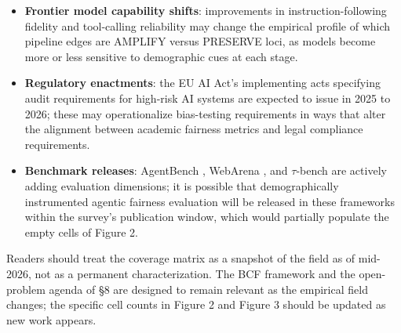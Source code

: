 \documentclass[10pt]{article}
\begin{document}
\begin{itemize}
\item \textbf{Frontier model capability shifts}: improvements in instruction-following fidelity and tool-calling reliability may change the empirical profile of which pipeline edges are AMPLIFY versus PRESERVE loci, as models become more or less sensitive to demographic cues at each stage.
\item \textbf{Regulatory enactments}: the EU AI Act's implementing acts specifying audit requirements for high-risk AI systems are expected to issue in 2025 to 2026; these may operationalize bias-testing requirements in ways that alter the alignment between academic fairness metrics and legal compliance requirements.
\item \textbf{Benchmark releases}: AgentBench \cite{liu2024agentbench}, WebArena \cite{zhou2024webarena}, and $\tau$-bench are actively adding evaluation dimensions; it is possible that demographically instrumented agentic fairness evaluation will be released in these frameworks within the survey's publication window, which would partially populate the empty cells of Figure 2.
\end{itemize}

Readers should treat the coverage matrix as a snapshot of the field as of mid-2026, not as a permanent characterization. The BCF framework and the open-problem agenda of \S{}8 are designed to remain relevant as the empirical field changes; the specific cell counts in Figure 2 and Figure 3 should be updated as new work appears.
\end{document}
